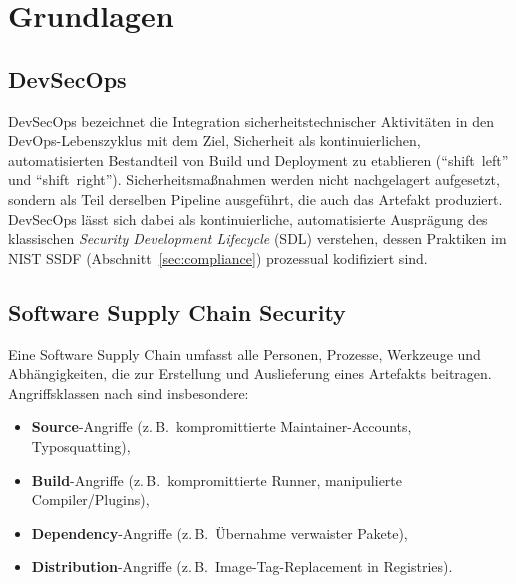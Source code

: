 \documentclass[12pt, a4paper]{scrartcl}
\begin{document}
\section{Grundlagen}\label{sec:grundlagen}

\subsection{DevSecOps}
DevSecOps bezeichnet die Integration sicherheitstechnischer Aktivitäten in
den DevOps-Lebenszyklus mit dem Ziel, Sicherheit als kontinuierlichen,
automatisierten Bestandteil von Build und Deployment zu etablieren
(\enquote{shift~left} und \enquote{shift~right}). Sicherheitsmaßnahmen
werden nicht nachgelagert aufgesetzt, sondern als Teil derselben Pipeline
ausgeführt, die auch das Artefakt produziert. DevSecOps lässt sich dabei
als kontinuierliche, automatisierte Ausprägung des klassischen
\emph{Security Development Lifecycle} (SDL) verstehen, dessen Praktiken
im NIST SSDF (Abschnitt~\ref{sec:compliance}) prozessual kodifiziert sind.

\subsection{Software Supply Chain Security}
Eine Software Supply Chain umfasst alle Personen, Prozesse, Werkzeuge und
Abhängigkeiten, die zur Erstellung und Auslieferung eines Artefakts beitragen.
Angriffsklassen nach \cite{slsa} sind insbesondere:
\begin{itemize}[leftmargin=1.4em]
  \item \textbf{Source}-Angriffe (z.\,B.\ kompromittierte Maintainer-Accounts,
        Typosquatting),
  \item \textbf{Build}-Angriffe (z.\,B.\ kompromittierte Runner, manipulierte
        Compiler/Plugins),
  \item \textbf{Dependency}-Angriffe (z.\,B.\ Übernahme verwaister Pakete),
  \item \textbf{Distribution}-Angriffe (z.\,B.\ Image-Tag-Replacement in
        Registries).
\end{itemize}
\end{document}
